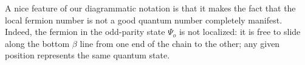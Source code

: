 A nice feature of our diagrammatic notation is that it makes the fact that the local fermion number is not a good quantum number completely manifest.
Indeed, the fermion in the odd-parity state $\Psi_o$ is not localized: it is free to slide along the bottom $\beta$ line
from one end of the chain to the other; any given position represents the same quantum state.


